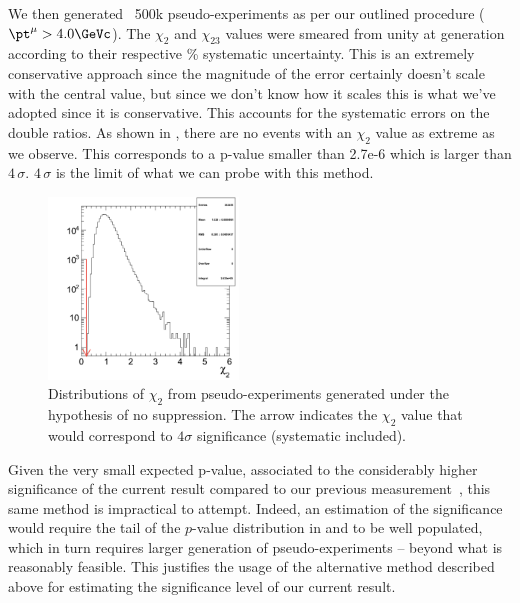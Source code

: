 We then generated ~500k pseudo-experiments as per our outlined procedure ($\pt^\mu>4.0\GeVc$). The $\chi_{2}$ and $\chi_{23}$ values were smeared from unity at generation according to their respective \% systematic uncertainty.  This is an extremely conservative approach since the magnitude of the error certainly doesn't scale with the central value, but since we don't know how it scales this is what we've adopted since it is conservative.  This accounts for the systematic errors on the double ratios. As shown in , there are no events with an $\chi_{2}$ value as extreme as we observe.  This corresponds to a p-value smaller than 2.7e-6 which is larger than $4\,\sigma$. $4\,\sigma$ is the limit of what we can probe with this method.

\begin{figure}[hbtp]
  \begin{center}
    \includegraphics[angle=0,width=0.45\textwidth]{figures/significance/ToySignificance_x2.pdf}
    \caption{Distributions of $\chi_{2}$ from pseudo-experiments generated under the hypothesis of no suppression. The arrow indicates the $\chi_{2}$ value that would correspond to $4\sigma$ significance (systematic included).}
    \label{fig:chi2_significance}
  \end{center}
\end{figure}


Given the very small expected p-value, associated to the considerably higher significance of the current result compared to our previous measurement~\cite{prl}, this same method is impractical to attempt. 
Indeed, an estimation of the significance would require the tail of the $p$-value distribution in  and  to be well populated, which in turn requires larger generation of pseudo-experiments --  
beyond what is reasonably feasible. 
This justifies the usage of the alternative method described above for estimating the significance level of our current result.



